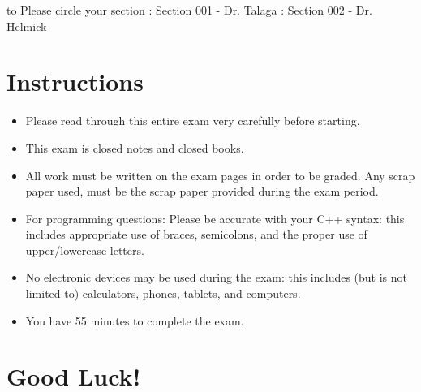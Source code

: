 \documentclass[11pt,answers]{exam}
\begin{document}
\begin{center} 
\end{center}

\lstset{language=C++,numbers=left, numberstyle=\tiny, stepnumber=1, numbersep=5pt, showstringspaces=true}

\vspace{0.1in} 
\hbox to \textwidth{Name:\enspace\hrulefill} 
Please circle your section : Section 001 - Dr. Talaga : Section 002 - Dr. Helmick

\section*{Instructions}
\begin{itemize}
\item Please read through this entire exam very carefully before starting. 
\item This exam is closed notes and closed books.
\item All work must be written on the exam pages in order to be graded. Any scrap paper used, must be the scrap paper provided during the exam period.
\item For programming questions: Please be accurate with your C++ syntax: this includes appropriate use of braces, semicolons, and the proper use of upper/lowercase letters.  
\item No electronic devices may be used during the exam: this includes (but is not limited to) calculators, phones, tablets, and computers.
\item You have 55 minutes to complete the exam.  
\end{itemize}

\section*{Good Luck!}

\begin{center} 
	\combinedgradetable[h]
\end{center}
\newpage
\end{document}
